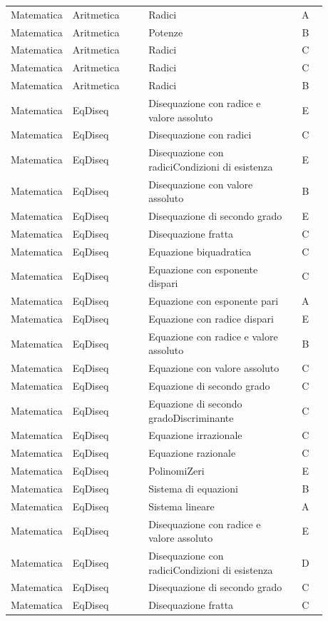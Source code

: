 \documentclass[20pt, a4paper]{article}
\begin{document}
\begin{longtable}{@{}>{\raggedright\arraybackslash}p{0.18\linewidth}>{\raggedright\arraybackslash}p{0.24\linewidth}>{\raggedright\arraybackslash}p{0.46\linewidth}c@{}}
Matematica & Aritmetica & Radici & A \\
Matematica & Aritmetica & Potenze & B \\
Matematica & Aritmetica & Radici & C \\
Matematica & Aritmetica & Radici & C \\
Matematica & Aritmetica & Radici & B \\
Matematica & EqDiseq & Disequazione con radice e valore assoluto & E \\
Matematica & EqDiseq & Disequazione con radici & C \\
Matematica & EqDiseq & Disequazione con radiciCondizioni di esistenza & E \\
Matematica & EqDiseq & Disequazione con valore assoluto & B \\
Matematica & EqDiseq & Disequazione di secondo grado & E \\
Matematica & EqDiseq & Disequazione fratta & C \\
Matematica & EqDiseq & Equazione biquadratica & C \\
Matematica & EqDiseq & Equazione con esponente dispari & C \\
Matematica & EqDiseq & Equazione con esponente pari & A \\
Matematica & EqDiseq & Equazione con radice dispari & E \\
Matematica & EqDiseq & Equazione con radice e valore assoluto & B \\
Matematica & EqDiseq & Equazione con valore assoluto & C \\
Matematica & EqDiseq & Equazione di secondo grado & C \\
Matematica & EqDiseq & Equazione di secondo gradoDiscriminante & C \\
Matematica & EqDiseq & Equazione irrazionale & C \\
Matematica & EqDiseq & Equazione razionale & C \\
Matematica & EqDiseq & PolinomiZeri & E \\
Matematica & EqDiseq & Sistema di equazioni & B \\
Matematica & EqDiseq & Sistema lineare & A \\
Matematica & EqDiseq & Disequazione con radice e valore assoluto & E \\
Matematica & EqDiseq & Disequazione con radiciCondizioni di esistenza & D \\
Matematica & EqDiseq & Disequazione di secondo grado & C \\
Matematica & EqDiseq & Disequazione fratta & C \\

\end{longtable}
\end{document}
